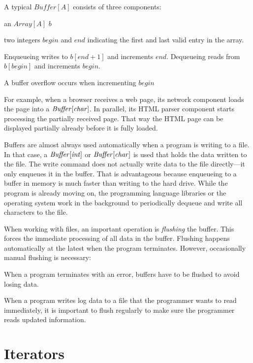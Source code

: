 A typical $\mathit{Buffer}[A]$ consists of three components:
\begin{compactitem}
 \item an $Array[A]$ $b$
 \item two integers $begin$ and $end$ indicating the first and last valid entry in the array.
\end{compactitem}
Enqueueing writes to $b[end+1]$ and increments $end$.
Dequeueing reads from $b[begin]$ and increments $begin$.


A buffer overflow occurs when incrementing $begin$ 

For example, when a browser receives a web page, its network component loads the page into a $\mathit{Buffer}[\mathit{char}]$.
In parallel, its HTML parser component starts processing the partially received page.
That way the HTML page can be displayed partially already before it is fully loaded.

Buffers are almost always used automatically when a program is writing to a file.
In that case, a $\mathit{Buffer}[\mathit{int}]$ or $\mathit{Buffer}[\mathit{char}]$ is used that holds the data written to the file.
The write command does not actually write data to the file directly---it only enqueues it in the buffer.
That is advantageous because enqueueing to a buffer in memory is much faster than writing to the hard drive.
While the program is already moving on, the programming language libraries or the operating system work in the background to periodically dequeue and write all characters to the file.

When working with files, an important operation is \emph{flushing} the buffer.
This forces the immediate processing of all data in the buffer.
Flushing happens automatically at the latest when the program terminates.
However, occasionally manual flushing is necessary:
\begin{compactitem}
 \item When a program terminates with an error, buffers have to be flushed to avoid losing data.
 \item When a program writes log data to a file that the programmer wants to read immediately, it is important to flush regularly to make sure the programmer reads updated information.
\end{compactitem}

\section{Iterators}\label{sec:ad:iter}


